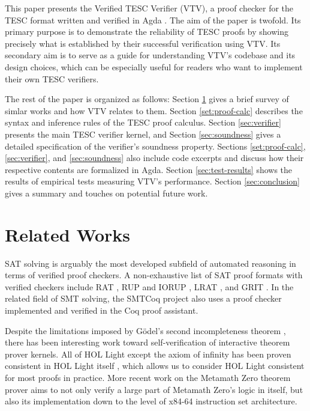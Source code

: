 \documentclass[12pt]{article}
\begin{document}
This paper presents the Verified TESC Verifier (VTV), a proof checker for  
the TESC format written and verified in Agda \cite{bove2009brief}. 
The aim of the paper is twofold. Its primary purpose is to demonstrate the 
reliability of TESC proofs by showing precisely what is established by their successful 
verification using VTV. Its secondary aim is to serve as a guide for understanding 
VTV's codebase and its design choices, which can be especially useful for readers 
who want to implement their own TESC verifiers.

The rest of the paper is organized as follows:
Section \ref{sec:rel-works} gives a brief survey of simlar works and how VTV relates to them.
Section \ref{set:proof-calc} describes the syntax and inference rules of the TESC proof calculus.
Section \ref{sec:verifier} presents the main TESC verifier kernel, and
Section \ref{sec:soundness} gives a detailed specification of the verifier's soundness property.
Sections \ref{set:proof-calc}, \ref{sec:verifier}, and \ref{sec:soundness} also include code 
excerpts and discuss how their respective contents are formalized in Agda.
Section \ref{sec:test-results} shows the  results of empirical tests measuring VTV's performance.
Section \ref{sec:conclusion} gives a summary and touches on potential future work.

\section{Related Works} \label{sec:rel-works}

SAT solving is arguably the most developed subfield of automated reasoning in terms of 
verified proof checkers. A non-exhaustive list of SAT proof formats with verified checkers
include RAT \cite{heule2013verifying}, RUP and IORUP \cite{heule2014bridging},
LRAT \cite{cruz2017lrat}, and GRIT \cite{cruz2017grit}. In the related field of SMT solving,
the SMTCoq project \cite{armand2011modular} also uses a proof checker implemented and
verified in the Coq proof assistant.

Despite the limitations imposed by G\"odel's second incompleteness theorem \cite{godel1931formal},
there has been interesting work toward self-verification of interactive 
theorem prover kernels. All of HOL Light except the axiom of infinity has been 
proven consistent in HOL Light itself \cite{harrison2006towards}, which allows us to consider HOL Light
consistent for most proofs in practice. More recent work on the Metamath Zero \cite{carneiro2019metamath}
theorem prover aims to not only verify a large part of Metamath Zero's logic in itself, 
but also its implementation down to the level of x84-64 instruction set architecture. 
\end{document}

